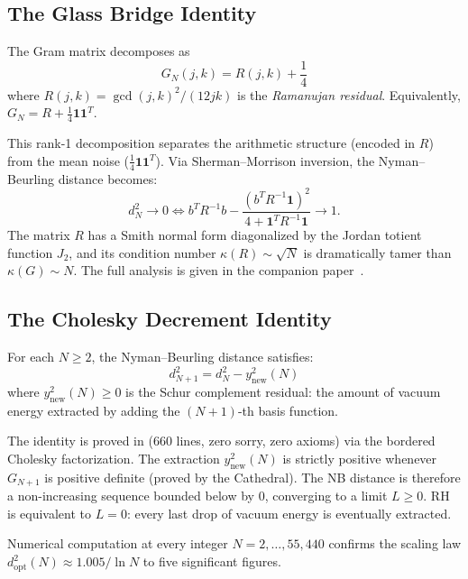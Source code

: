 \documentclass[11pt,a4paper]{article}
\begin{document}
\subsection{The Glass Bridge Identity}
\label{sec:glass}

\begin{theorem}
\label{thm:glass}
The Gram matrix decomposes as
\[
  G_N(j,k) = R(j,k) + \frac{1}{4}
\]
where $R(j,k) = \gcd(j,k)^2/(12jk)$ is the \emph{Ramanujan residual}.
Equivalently, $G_N = R + \frac{1}{4}\mathbf{1}\mathbf{1}^T$.
\end{theorem}

This rank-1 decomposition separates the arithmetic structure (encoded
in $R$) from the mean noise ($\frac{1}{4}\mathbf{1}\mathbf{1}^T$).
Via Sherman--Morrison inversion, the Nyman--Beurling distance becomes:
\[
  d_N^2 \to 0 \iff b^T R^{-1} b
  - \frac{(b^T R^{-1}\mathbf{1})^2}{4 + \mathbf{1}^T R^{-1}\mathbf{1}} \to 1.
\]
The matrix $R$ has a Smith normal form diagonalized by the Jordan
totient function $J_2$, and its condition number $\kappa(R) \sim \sqrt{N}$
is dramatically tamer than $\kappa(G) \sim N$.
The full analysis is given in the companion paper~\cite{glasspaper}.

\subsection{The Cholesky Decrement Identity}
\label{sec:cholesky}

\begin{theorem}
For each $N \geq 2$, the Nyman--Beurling distance satisfies:
\[
  d^2_{N+1} = d^2_N - y^2_{\mathrm{new}}(N)
\]
where $y^2_{\mathrm{new}}(N) \geq 0$ is the Schur complement residual:
the amount of vacuum energy extracted by adding the $(N+1)$-th
basis function.
\end{theorem}

The identity is proved in 
(660 lines, zero sorry, zero axioms) via the bordered Cholesky
factorization. The extraction $y^2_{\mathrm{new}}(N)$ is strictly
positive whenever $G_{N+1}$ is positive definite (proved by the
Cathedral). The NB distance is therefore a non-increasing sequence
bounded below by $0$, converging to a limit $L \geq 0$.
RH is equivalent to $L = 0$: every last drop of vacuum energy is
eventually extracted.

Numerical computation at every integer $N = 2, \ldots, 55{,}440$
confirms the scaling law $d^2_{\mathrm{opt}}(N) \approx 1.005/\ln N$
to five significant figures.
\end{document}
